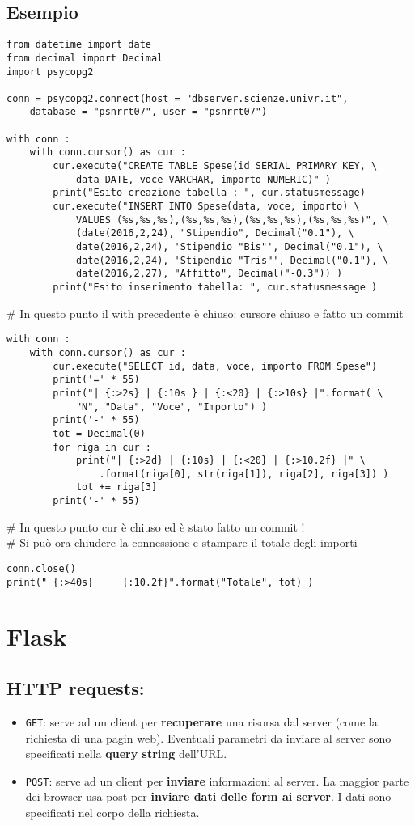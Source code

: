\documentclass[a4paper, 10pt, titlepage]{article}
\begin{document}
	\subsection{Esempio}
	\begin{lstlisting}
from datetime import date
from decimal import Decimal
import psycopg2

conn = psycopg2.connect(host = "dbserver.scienze.univr.it", 
	database = "psnrrt07", user = "psnrrt07")

with conn :
	with conn.cursor() as cur :
		cur.execute("CREATE TABLE Spese(id SERIAL PRIMARY KEY, \
			data DATE, voce VARCHAR, importo NUMERIC)" )
		print("Esito creazione tabella : ", cur.statusmessage)
		cur.execute("INSERT INTO Spese(data, voce, importo) \
			VALUES (%s,%s,%s),(%s,%s,%s),(%s,%s,%s),(%s,%s,%s)", \
			(date(2016,2,24), "Stipendio", Decimal("0.1"), \
			date(2016,2,24), 'Stipendio "Bis"', Decimal("0.1"), \
			date(2016,2,24), 'Stipendio "Tris"', Decimal("0.1"), \
			date(2016,2,27), "Affitto", Decimal("-0.3")) )
		print("Esito inserimento tabella: ", cur.statusmessage )
	\end{lstlisting}	
\# In questo punto il with precedente è chiuso: cursore chiuso e fatto un commit
	\begin{lstlisting}
with conn :
	with conn.cursor() as cur : 
		cur.execute("SELECT id, data, voce, importo FROM Spese")
		print('=' * 55)
		print("| {:>2s} | {:10s } | {:<20} | {:>10s} |".format( \
			"N", "Data", "Voce", "Importo") )
		print('-' * 55)
		tot = Decimal(0)
		for riga in cur :
			print("| {:>2d} | {:10s} | {:<20} | {:>10.2f} |" \
				.format(riga[0], str(riga[1]), riga[2], riga[3]) )
			tot += riga[3]
		print('-' * 55)
		\end{lstlisting}
\# In questo punto cur è chiuso ed è stato fatto un commit !  \\
\# Si può ora chiudere la connessione e stampare il totale degli importi
	\begin{lstlisting}
conn.close()
print(" {:>40s}		{:10.2f}".format("Totale", tot) )
	\end{lstlisting}	
	\newpage
	
			
		
	\section{Flask}
	\lstset{language=Python}
		\subsection{HTTP requests:}
			\begin{itemize}
				\item \lstinline|GET|: serve ad un client per \textbf{recuperare} una risorsa dal server (come la richiesta di una pagin web). Eventuali parametri da inviare al server sono specificati nella \textbf{query string} dell'URL.
				\item \lstinline|POST|: serve ad un client per \textbf{inviare} informazioni al server. La maggior parte dei browser usa post per \textbf{inviare dati delle form ai server}. I dati sono specificati nel corpo della richiesta.
			\end{itemize}
\end{document}
